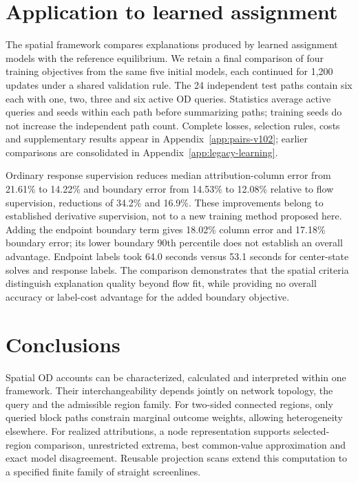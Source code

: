 \documentclass[a4paper,fleqn]{cas-sc}
\begin{document}




\FloatBarrier
\section{Application to learned assignment}\label{sec:pairresults}
The spatial framework compares explanations produced by learned assignment
models with the reference equilibrium. We retain a final comparison of four
training objectives from the same five initial models, each continued for
1,200 updates under a shared validation rule. The 24 independent test paths
contain six each with one, two, three and six active OD queries. Statistics
average active queries and seeds within each path before summarizing paths;
training seeds do not increase the independent path count. Complete losses,
selection rules, costs and supplementary results appear in
Appendix~\ref{app:pairs-v102}; earlier comparisons are consolidated in
Appendix~\ref{app:legacy-learning}.

Ordinary response supervision reduces median attribution-column error from
21.61\% to 14.22\% and boundary error from 14.53\% to 12.08\% relative to
flow supervision, reductions of 34.2\% and 16.9\%. These improvements belong
to established derivative supervision, not to a new training method proposed
here. Adding the endpoint boundary term gives 18.02\% column error and
17.18\% boundary error; its lower boundary 90th percentile does not establish
an overall advantage. Endpoint labels took 64.0 seconds versus 53.1 seconds
for center-state solves and response labels. The comparison demonstrates
that the spatial criteria distinguish explanation quality beyond flow fit,
while providing no overall accuracy or label-cost advantage for the added
boundary objective.

\section{Conclusions}\label{sec:conclusions}
Spatial OD accounts can be characterized, calculated and interpreted within
one framework. Their interchangeability depends jointly on network topology,
the query and the admissible region family. For two-sided connected regions,
only queried block paths constrain marginal outcome weights, allowing
heterogeneity elsewhere. For realized attributions, a node representation
supports selected-region comparison, unrestricted extrema, best common-value
approximation and exact model disagreement. Reusable projection scans extend
this computation to a specified finite family of straight screenlines.
\end{document}

